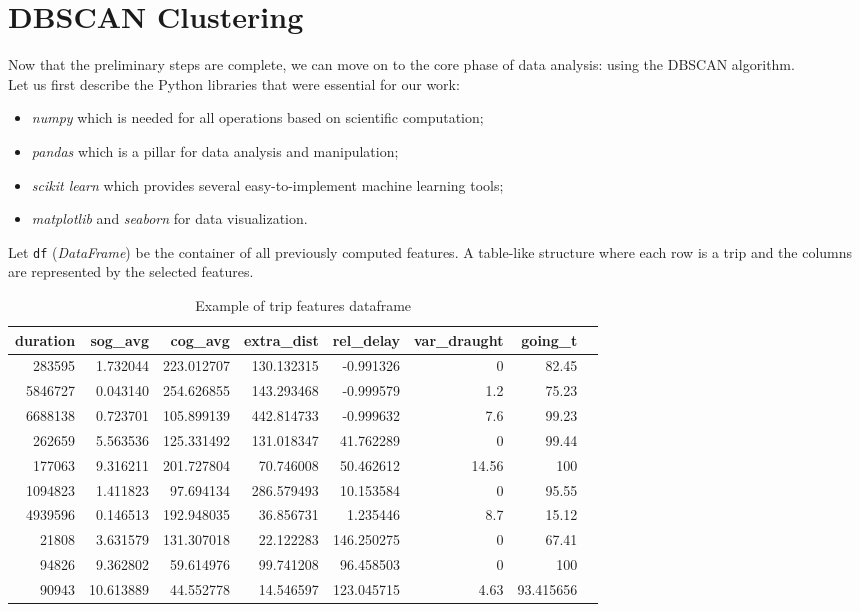 \clearpage

\clearpage

\section{DBSCAN Clustering}
\label{sec:clustering}

Now that the preliminary steps are complete, we can move on to the core phase of data analysis: \clustering using the DBSCAN algorithm.
\\
Let us first describe the Python libraries that were essential for our work:
\begin{itemize}
\item \textit{numpy} \cite{numpy} which is needed for all operations based on scientific computation;
\item \textit{pandas} \cite{pandas} which is a pillar for data analysis and manipulation;
\item \textit{scikit learn} \cite{sklearn} which provides several easy-to-implement machine learning tools;
\item \textit{matplotlib} \cite{matplotlib} and \textit{seaborn} \cite{seaborn} for data visualization.
\end{itemize}

Let \verb|df| (\textit{DataFrame}) be the container of all previously computed features. A table-like structure where each row is a trip and the columns are represented by the selected features.

\begin{table}[H]
\centering
\begin{tabular}{|r|r|r|r|r|r|r|r|}
\hline
\textbf{duration} & \textbf{sog\_avg} & \textbf{cog\_avg} & \textbf{extra\_dist} & \textbf{rel\_delay} & \textbf{var\_draught} & \textbf{going\_t} \\
\hline
283595 & 1.732044 & 223.012707 & 130.132315 & -0.991326 & 0 & 82.45 \\
5846727 & 0.043140 & 254.626855 & 143.293468 & -0.999579 & 1.2 & 75.23 \\
6688138 & 0.723701 & 105.899139 & 442.814733 & -0.999632 & 7.6 & 99.23 \\
262659 & 5.563536 & 125.331492 & 131.018347 & 41.762289 & 0 & 99.44 \\
177063 & 9.316211 & 201.727804 & 70.746008 & 50.462612 & 14.56 & 100 \\
1094823 & 1.411823 & 97.694134 & 286.579493 & 10.153584 & 0 & 95.55 \\
4939596 & 0.146513 & 192.948035 & 36.856731 & 1.235446 & 8.7 & 15.12 \\
21808 & 3.631579 & 131.307018 & 22.122283 & 146.250275 & 0 & 67.41 \\
94826 & 9.362802 & 59.614976 & 99.741208 & 96.458503 & 0 & 100 \\
90943 & 10.613889 & 44.552778 & 14.546597 & 123.045715 & 4.63 & 93.415656 \\
\hline
\end{tabular}
\caption{Example of trip features dataframe}
\end{table}


